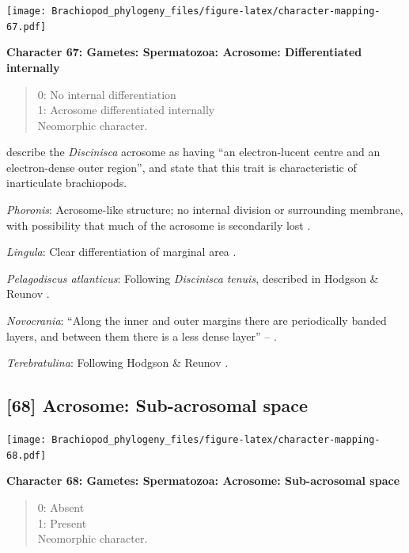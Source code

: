 \documentclass[]{book}
\theoremstyle{definition}
\theoremstyle{definition}
\theoremstyle{definition}
\theoremstyle{remark}
\begin{document}
\texttt{[image: Brachiopod\_phylogeny\_files/figure-latex/character-mapping-67.pdf]}

\textbf{Character 67: Gametes: Spermatozoa: Acrosome: Differentiated
internally}

\begin{quote}
0: No internal differentiation\\
1: Acrosome differentiated internally\\
Neomorphic character.
\end{quote}

\citet{Hodgson1994Ultrastructureof} describe the \emph{Discinisca}
acrosome as having ``an electron-lucent centre and an electron-dense
outer region'', and state that this trait is characteristic of
inarticulate brachiopods.

\emph{Phoronis}: Acrosome-like structure; no internal division or
surrounding membrane, with possibility that much of the acrosome is
secondarily lost \citep{Reunov2004Ultrastructuralstudy}.

\emph{Lingula}: Clear differentiation of marginal area
\citep{Fukumoto2003Theacrosome}.

\emph{Pelagodiscus atlanticus}: Following \emph{Discinisca}
\emph{tenuis}, described in Hodgson \& Reunov
\citeyearpar{Hodgson1994Ultrastructureof}.

\emph{Novocrania}: ``Along the inner and outer margins there are
periodically banded layers, and between them there is a less dense
layer'' -- \citet{Afzelius1978Finestructure}.

\emph{Terebratulina}: Following Hodgson \& Reunov
\citeyearpar{Hodgson1994Ultrastructureof}.

\hypertarget{acrosome-sub-acrosomal-space}{%
\subsection*{{[}68{]} Acrosome: Sub-acrosomal
space}\label{acrosome-sub-acrosomal-space}}

\texttt{[image: Brachiopod\_phylogeny\_files/figure-latex/character-mapping-68.pdf]}

\textbf{Character 68: Gametes: Spermatozoa: Acrosome: Sub-acrosomal
space}

\begin{quote}
0: Absent\\
1: Present\\
Neomorphic character.
\end{quote}
\end{document}
